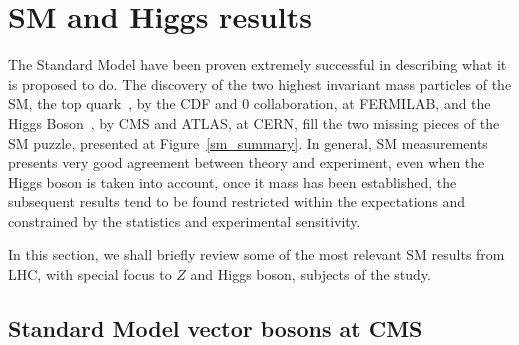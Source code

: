\section{SM and Higgs results}
\label{section_sm_higgs}

The Standard Model have been proven extremely successful in describing what it is proposed to do. The discovery of the two highest invariant mass particles of the SM, the top quark~\cite{top_discovery_cdf,top_discovery_d0}, by the CDF and 0 collaboration, at FERMILAB, and the Higgs Boson~\cite{higgs_discovery_cms,higgs_discovery_atlas}, by CMS and ATLAS, at CERN, fill the two missing pieces of the SM puzzle, presented at Figure~\ref{sm_summary}. In general, SM measurements presents very good agreement between theory and experiment, even when the Higgs boson is taken into account, once it mass has been established, the subsequent results tend to be found restricted within the expectations and constrained by the statistics and experimental sensitivity.  

In this section, we shall briefly review some of the most relevant SM results from LHC, with special focus to $Z$ and Higgs boson, subjects of the study. 

\subsection{Standard Model vector bosons at CMS}
\label{section_sm_vb_results}


